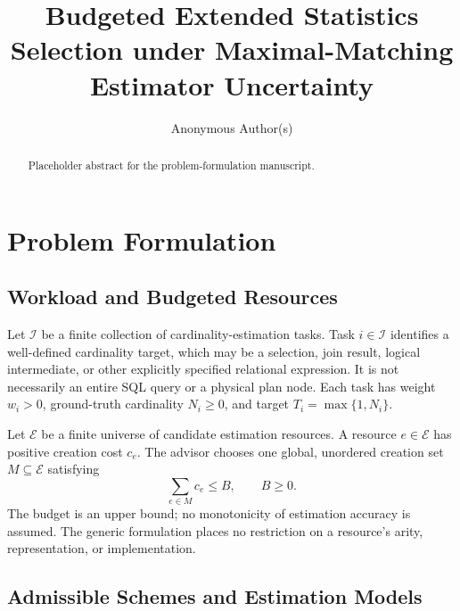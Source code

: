 \documentclass[sigconf, nonacm]{acmart}
\newcommand{\E}{\mathcal{E}}
\begin{document}
\title{Budgeted Extended Statistics Selection under Maximal-Matching Estimator Uncertainty}

\author{Anonymous Author(s)}

\begin{abstract}
Placeholder abstract for the problem-formulation manuscript.
\end{abstract}

\maketitle

\vldbtopmatter

\section{Problem Formulation}

\subsection{Workload and Budgeted Resources}

Let \(\mathcal I\) be a finite collection of cardinality-estimation tasks.
Task \(i\in\mathcal I\) identifies a well-defined cardinality target, which
may be a selection, join result, logical intermediate, or other explicitly
specified relational expression.  It is not necessarily an entire SQL
query or a physical plan node.  Each task has weight \(w_i>0\), ground-truth
cardinality \(N_i\geq0\), and target \(T_i=\max\{1,N_i\}\).

Let \(\E\) be a finite universe of candidate estimation resources.  A
resource \(e\in\E\) has positive creation cost \(c_e\).  The advisor chooses
one global, unordered creation set \(M\subseteq\E\) satisfying
\[
  \sum_{e\in M}c_e\leq B,\qquad B\geq0.
\]
The budget is an upper bound; no monotonicity of estimation accuracy is
assumed.  The generic formulation places no restriction on a resource's
arity, representation, or implementation.

\subsection{Admissible Schemes and Estimation Models}
\end{document}
